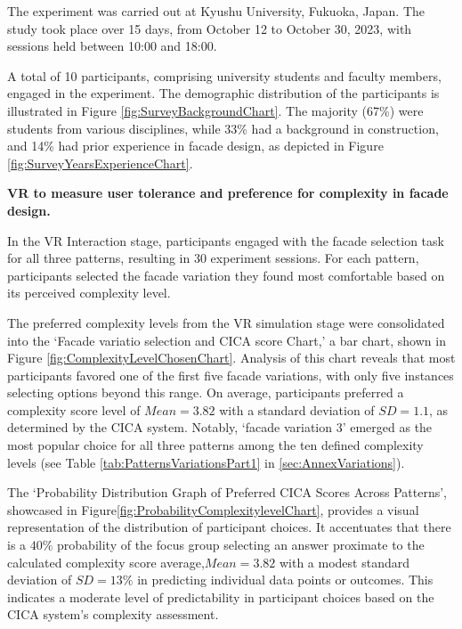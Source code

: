 
The experiment was carried out at Kyushu University, Fukuoka, Japan.
The study took place over 15 days, from October 12 to October 30, 2023, with sessions held between 10:00 and 18:00.

A total of 10 participants, comprising university students and faculty members, engaged in the experiment.
The demographic distribution of the participants is illustrated in Figure \ref{fig:SurveyBackgroundChart}.
The majority (67\%) were students from various disciplines, while 33\% had a background in construction, and 14\% had prior experience in facade design, as depicted in Figure \ref{fig:SurveyYearsExperienceChart}.

\textbf{VR to measure user tolerance and preference for complexity in facade design.}

In the VR Interaction stage, participants engaged with the facade selection task for all three patterns, resulting in 30 experiment sessions.
For each pattern, participants selected the facade variation they found most comfortable based on its perceived complexity level.


The preferred complexity levels from the VR simulation stage were consolidated into the `Facade variatio selection and CICA score Chart,' a bar chart, shown in Figure \ref{fig:ComplexityLevelChosenChart}.
Analysis of this chart reveals that most participants favored one of the first five facade variations, with only five instances selecting options beyond this range.
On average, participants preferred a complexity score level of \(Mean = 3.82\) with a standard deviation of \(SD = 1.1\), as determined by the CICA system.
Notably, `facade variation 3'  emerged as the most popular choice for all three patterns among the ten defined complexity levels (see Table \ref{tab:PatternsVariationsPart1} in \ref{sec:AnnexVariations}).


The `Probability Distribution Graph of Preferred CICA Scores Across Patterns', showcased in Figure\ref{fig:ProbabilityComplexitylevelChart}, provides a visual representation of the distribution of participant choices.
It accentuates that there is a \(40\%\) probability of the focus group selecting an answer proximate to the calculated complexity score average,\(Mean = 3.82\) with a modest standard deviation of \(SD = 13\%\) in predicting individual data points or outcomes.
 This indicates a moderate level of predictability in participant choices based on the CICA system's complexity assessment.

